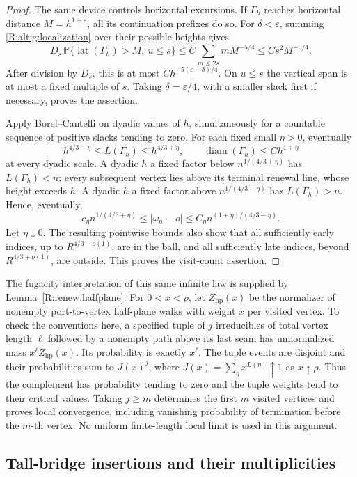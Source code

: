 \begin{proof}
The same device controls horizontal excursions. If $\Gamma_h$ reaches
horizontal distance $M=h^{1+\varepsilon}$, all its continuation
prefixes do so. For $\delta<\varepsilon$, summing
\eqref{R:alt:g:localization} over their possible heights gives
\[
 D_s\,\mathbb P\{\operatorname{lat}(\Gamma_h)>M,\ u\le s\}
 \le C\sum_{m\le2s}mM^{-5/4}\le Cs^2M^{-5/4}.
\]
After division by $D_s$, this is at most
$Ch^{-5(\varepsilon-\delta)/4}$. On $u\le s$ the vertical span is
at most a fixed multiple of $s$. Taking $\delta=\varepsilon/4$,
with a smaller slack first if necessary, proves the assertion.

Apply Borel--Cantelli on dyadic values of $h$, simultaneously for a
countable sequence of positive slacks tending to zero. For each fixed
small $\eta>0$, eventually
\[
 h^{4/3-\eta}\le L(\Gamma_h)\le h^{4/3+\eta},\qquad
 \operatorname{diam}(\Gamma_h)\le Ch^{1+\eta}
\]
at every dyadic scale. A dyadic $h$ a fixed factor below
$n^{1/(4/3+\eta)}$ has $L(\Gamma_h)<n$; every subsequent vertex lies
above its terminal renewal line, whose height exceeds $h$. A dyadic
$h$ a fixed factor above $n^{1/(4/3-\eta)}$ has
$L(\Gamma_h)>n$. Hence, eventually,
\[
 c_\eta n^{1/(4/3+\eta)}\le|\omega_n-o|
 \le C_\eta n^{(1+\eta)/(4/3-\eta)}.
\]
Let $\eta\downarrow0$. The resulting pointwise bounds also show that
all sufficiently early indices, up to $R^{4/3-o(1)}$, are in the ball,
and all sufficiently late indices, beyond $R^{4/3+o(1)}$, are outside.
This proves the visit-count assertion.
\end{proof}

The fugacity interpretation of this same infinite law is supplied by
Lemma~\ref{R:renew:halfplane}. For $0<x<\rho$, let
$Z_{\mathrm{hp}}(x)$ be the normalizer of nonempty port-to-vertex
half-plane walks with weight $x$ per visited vertex. To check the
conventions here, a specified tuple of $j$ irreducibles of total vertex length $\ell$
followed by a nonempty path above its last seam has unnormalized mass
$x^\ell Z_{\mathrm{hp}}(x)$. Its probability is exactly $x^\ell$.
The tuple events are disjoint and their probabilities sum to
$J(x)^j$, where $J(x)=\sum_\eta x^{L(\eta)}\uparrow1$ as
$x\uparrow\rho$. Thus the complement has probability tending to zero
and the tuple weights tend to their critical values. Taking $j\ge m$
determines the first $m$ visited vertices and proves local convergence,
including vanishing probability of termination before the $m$-th vertex.
No uniform finite-length local limit is used in this argument.

\subsection{Tall-bridge insertions and their multiplicities}

